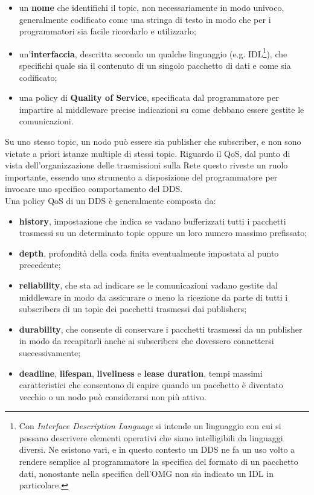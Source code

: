 \begin{itemize}
    \item un \textbf{nome} che identifichi il topic, non necessariamente in modo univoco, generalmente codificato come una stringa di testo in modo che per i programmatori sia facile ricordarlo e utilizzarlo;
    \item un'\textbf{interfaccia}, descritta secondo un qualche linguaggio (e.g. IDL\footnote{Con \emph{Interface Description Language} si intende un linguaggio con cui si possano descrivere elementi operativi che siano intelligibili da linguaggi diversi. Ne esistono vari, e in questo contesto un DDS ne fa un uso volto a rendere semplice al programmatore la specifica del formato di un pacchetto dati, nonostante nella specifica dell'OMG non sia indicato un IDL in particolare.}), che specifichi quale sia il contenuto di un singolo pacchetto di dati e come sia codificato;
    \item una policy di \textbf{Quality of Service}, specificata dal programmatore per impartire al middleware precise indicazioni su come debbano essere gestite le comunicazioni.
\end{itemize}
\vfill\newpage
Su uno stesso topic, un nodo può essere sia publisher che subscriber, e non sono vietate a priori istanze multiple di stessi topic. Riguardo il QoS, dal punto di vista dell'organizzazione delle trasmissioni sulla Rete questo riveste un ruolo importante, essendo uno strumento a disposizione del programmatore per invocare uno specifico comportamento del DDS.\\
Una policy QoS di un DDS è generalmente composta da:
\begin{itemize}
    \item \textbf{history}, impostazione che indica se vadano bufferizzati tutti i pacchetti trasmessi su un determinato topic oppure un loro numero massimo prefissato;
    \item \textbf{depth}, profondità della coda finita eventualmente impostata al punto precedente;
    \item \textbf{reliability}, che sta ad indicare se le comunicazioni vadano gestite dal middleware in modo da assicurare o meno la ricezione da parte di tutti i subscribers di un topic dei pacchetti trasmessi dai publishers;
    \item \textbf{durability}, che consente di conservare i pacchetti trasmessi da un publisher in modo da recapitarli anche ai subscribers che dovessero connettersi successivamente;
    \item \textbf{deadline}, \textbf{lifespan}, \textbf{liveliness} e \textbf{lease duration}, tempi massimi caratteristici che consentono di capire quando un pacchetto è diventato vecchio o un nodo può considerarsi non più attivo.
\end{itemize}
